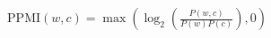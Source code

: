 \documentclass[preview]{standalone}
\begin{document}
\begin{align*}
\text{PPMI}(w,c) = \max \left( \log_2 \left( \frac{P(w,c)}{P(w)P(c)} \right), 0 \right)
\end{align*}
\end{document}
